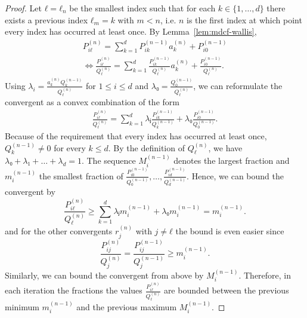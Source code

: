 \begin{proof}
  Let $ℓ = ℓ_n$ be the smallest index such that for each $k ∈ \{1, …, d\}$
  there exists a previous index $ℓ_m = k$ with $m < n$,
  i.e. $n$ is the first index at which point every index has occurred at least once.
  By Lemma~\ref{lem:mdcf-wallis},
  \begin{align*}
    P_{iℓ}^{(n)} = \sum_{k = 1}^d P_{ik}^{(n-1)} a_k^{(n)} + P_{i0}^{(n-1)} \\
    \iff
    \frac{P_{iℓ}^{(n)}}{Q_{ℓ}^{(n)}} = \sum_{k = 1}^d \frac{P_{ik}^{(n-1)}}{Q_ℓ^{(n)}} a_k^{(n)} + \frac{P_{i0}^{(n-1)}}{Q_ℓ^{(n)}}.
  \end{align*}
  Using $λ_i = \frac{a_k^{(n)} Q_k^{(n-1)}}{Q_ℓ^{(n)}}$ for $1 ≤ i ≤ d$ and $λ₀ = \frac{Q_0^{(n-1)}}{Q_ℓ^{(n)}}$,
  we can reformulate the convergent as a convex combination of the form
  \begin{align*}
    \frac{P_{iℓ}^{(n)}}{Q_{ℓ}^{(n)}} = \sum_{k = 1}^d λⱼ \frac{P_{ik}^{(n-1)}}{Q_k^{(n-1)}} + λ₀ \frac{P_{i0}^{(n-1)}}{Q_0^{(n-1)}}.
  \end{align*}
  Because of the requirement that every index has occurred at least once,
  $Q_k^{(n-1)} ≠ 0$ for every $k ≤ d$.
  By the definition of $Q_ℓ^{(n)}$, we have $λ₀ + λ₁ + \dots + λ_d = 1$.
  The sequence $M_i^{(n-1)}$ denotes the largest fraction and $m_i^{(n-1)}$ the smallest
  fraction of $\frac{P_{i0}^{(n-1)}}{Q_0^{(n-1)}}, …, \frac{P_{id}^{(n-1)}}{Q_d^{(n-1)}}$.
  Hence, we can bound the convergent by
  \[
    \frac{P_{iℓ}^{(n)}}{Q_{ℓ}^{(n)}} ≥ \sum_{k=1}^d λⱼ m_i^{(n-1)} + λ₀ m_i^{(n-1)} = m_i^{(n-1)}.
  \]
  and for the other convergents $r_j^{(n)}$ with $j ≠ ℓ$ the bound is even easier since
  \[
    \frac{P_{ij}^{(n)}}{Q_j^{(n)}} = \frac{P_{ij}^{(n-1)}}{Q_j^{(n-1)}} ≥ m_i^{(n-1)}.
  \]
  Similarly, we can bound the convergent from above by $M_i^{(n-1)}$.
  Therefore, in each iteration the fractions the values $\frac{P_{iℓ}^{(n)}}{Q_ℓ^{(n)}}$ are
  bounded between the previous minimum $m_i^{(n-1)}$ and the previous maximum
  $M_i^{(n-1)}$.
\end{proof}

\iffalse
  From the proof of the previous lemma, we can easily deduce that the sequences
  $m_i^{(n)}$ and $M_i^{(n)}$ must be converging to some number $m_i$ and $M_i$,
  respectively.
  However, it does not necessarily follow that the ratios in $r^{(n)}$ are also converging.
  This is because the minimum $m_i^{(n)}$ and the maximum $M_i^{(n)}$ might converge to different numbers $m ≠ M$
  and the ratios could therefore oscillate between a set of values between $m_i$ and $M_i$.
  For example, suppose the minimum $m^{(i)}$ is $r_j^{(n)}$ for some index $j$.
  The minimum changes only when $ℓ_{n'} = j$ for some $n' ≥ n$.
  But it might be the case that the other values in $r^{(n)}$ are still smaller
  than $r_j^{(n')}$ even after updating.
  Therefore, the minimum always tracks the same value in $r^{(n)}$.
  The same argument can be made for the maximum.
  But then these values don't necessarily have to assume the same value.
  The following lemma shows that this is not the case:
\fi

